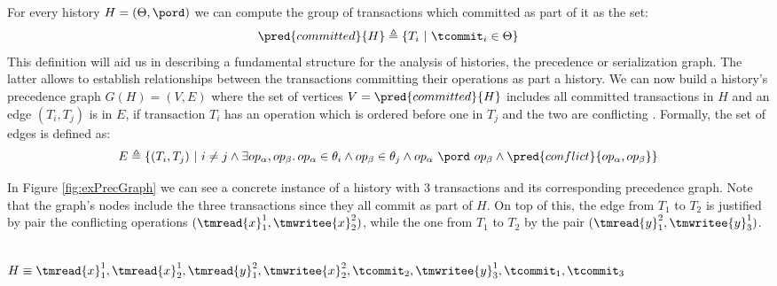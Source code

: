 For every history $H = (\Theta, \pord)$ we can compute the group of transactions which committed as part of it as the set:
\[
	\pred{committed}{H} \triangleq \{ T_i\ |\ \tcommit_i \in \Theta \}
\]
This definition will aid us in describing a fundamental structure for the analysis of histories, the precedence or serialization graph. The latter allows to establish relationships between the transactions committing their operations as part a history. We can now build a history's precedence graph $G(H) = (V, E)$ where the set of vertices $V = \pred{committed}{H}$ includes all committed transactions in $H$ and an edge $(T_i, T_j)$ is in $E$, if transaction $T_i$ has an operation which is ordered before one in $T_j$ and the two are conflicting \cite{dbconcepts}. Formally, the set of edges is defined as:
\[
	E \triangleq \{ (T_i, T_j)\ |\ i \neq j \land \exists op_\alpha, op_\beta \ldotp op_\alpha \in \theta_i \land op_\beta \in \theta_j \land op_\alpha\ \pord\ op_\beta \land \pred{conflict}{op_\alpha, op_\beta} \}
\]

In Figure \ref{fig:exPrecGraph} we can see a concrete instance of a history with $3$ transactions and its corresponding precedence graph. Note that the graph's nodes include the three transactions since they all commit as part of $H$. On top of this, the edge from $T_1$ to $T_2$ is justified by pair the conflicting operations $(\tmread{x}_1^1, \tmwritee{x}_2^2)$, while the one from $T_1$ to $T_2$ by the pair $(\tmread{y}_1^2, \tmwritee{y}_3^1)$.\\

\begin{center}
\\[0.4em]
$H \equiv \tmread{x}_1^1, \tmread{x}_2^1, \tmread{y}_1^2, \tmwritee{x}_2^2, \tcommit_2, \tmwritee{y}_3^1, \tcommit_1, \tcommit_3$
\label{fig:exPrecGraph}
\end{center}


